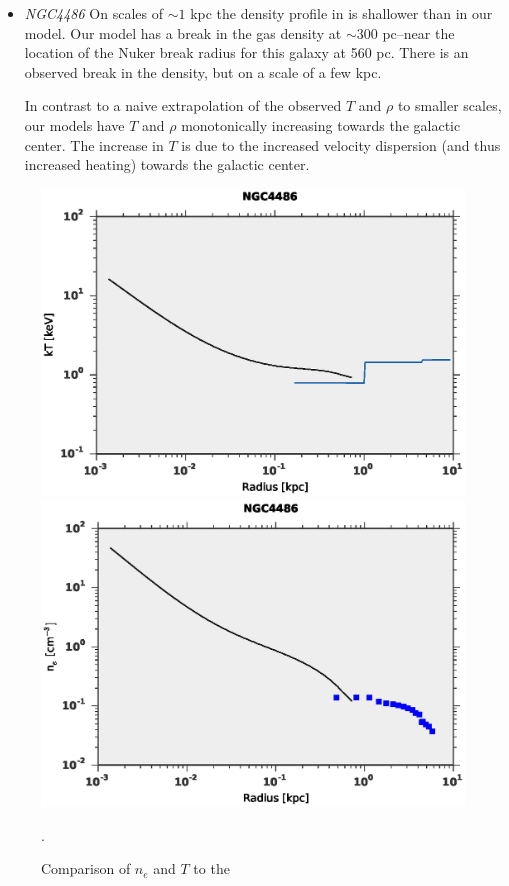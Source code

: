 \documentclass[usenatbib,fleqn]{mn2e}
\begin{document}
\begin{itemize}
\item \emph{NGC4486} %
On scales of $\sim1$ kpc the density profile in \citealt{AllenDunn+:2006a}  is shallower than in our model. Our model has a break in the gas density at $\sim 300$ pc--near the location of the Nuker break radius for this galaxy at 560 pc. There is an observed break in the density, but on a scale of a few kpc.

In contrast to a naive extrapolation of the observed $T$ and $\rho$ to smaller scales, our models have $T$ and $\rho$ monotonically increasing towards the galactic center. The increase in $T$ is due to the increased velocity dispersion (and thus increased heating) towards the galactic center.
\end{itemize}

\begin{figure}
\includegraphics[width=\columnwidth]{T_compare.eps}
\includegraphics[width=\columnwidth]{dens_compare.eps}
\caption{\label{fig:allen_compare} Comparison of $n_e$ and $T$ to the \citealt{AllenDunn+:2006a}}. 
\end{figure}
\end{document}
